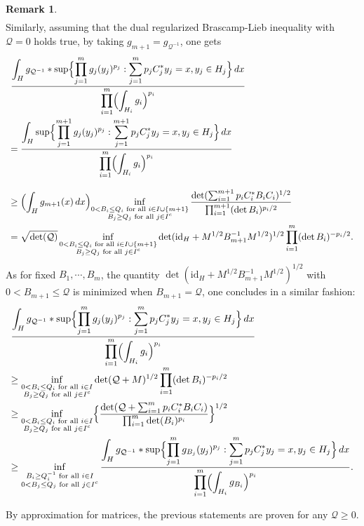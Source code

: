 \documentclass[11pt,a4paper,reqno]{amsart}
\numberwithin{equation}{section}
\theoremstyle{definition}
\newtheorem{remark}[theorem]{Remark}
\newcommand{\nm}{\noalign{\smallskip}}
\newcommand{\ds}{\displaystyle}
\newcommand{\<}{\ensuremath \leq}
\renewcommand{\>}{\ensuremath \geq}
\begin{document}
\begin{remark}
$$\begin{array}{lll}
\end{array}$$ 
Similarly, assuming that the dual regularized Brascamp-Lieb inequality with $\mathcal Q=0$ holds true, by taking $g_{m+1}=g_{\mathcal Q^{-1}}$, one gets $$\begin{array}{lll}
    \ds \frac{\ds \int_{H}g_{\mathcal Q^{-1}} * \sup \Bigl \{ \prod_{j=1}^m g_j(y_j)^{p_j}: \sum_{j=1}^m p_jC_j^*y_j=x, y_j \in H_j\Bigl \}\, dx}{\ds \prod_{i=1}^m \Bigl( \int_{H_i}g_i\Bigl)^{p_i}} \\
    \nm 
    \ds = \frac{\ds \int_{H}\sup \Bigl \{ \prod_{j=1}^{m+1} g_j(y_j)^{p_j}: \sum_{j=1}^{m+1} p_jC_j^*y_j=x, y_j \in H_j\Bigl \}\, dx}{\ds \prod_{i=1}^m \Bigl( \int_{H_i}g_i\Bigl)^{p_i}} \\ \\
    \geq \ds \Bigl( \int_H g_{m+1}(x)\, dx\Bigl) \inf_{\substack{0< B_i \leq Q_i \text{ for all } i \in I \cup \{m+1\} \\ B_j \geq Q_j \text{ for all } j \in I^c}}  \frac{\det(\sum_{i=1}^{m+1} p_i C_i^*B_iC_i)^{1/2}}{\prod_{i=1}^{m+1} (\det B_i)^{p_i/2}}  \\
    \nm 
    = \ds \sqrt{\det(\mathcal Q)} \inf_{\substack{0< B_i \leq Q_i \text{ for all } i \in I \cup \{m+1\} \\ B_j \geq Q_j \text{ for all } j \in I^c}}  \det(\mathrm{id}_H+M^{1/2}B_{m+1}^{-1}M^{1/2})^{1/2}\prod_{i=1}^m (\det B_i)^{-p_i/2}.
\end{array}$$ As for fixed $B_1,\cdots,B_m$, the quantity $\det(\mathrm{id}_H+M^{1/2}B_{m+1}^{-1}M^{1/2})^{1/2}$ with $0<B_{m+1} \leq \mathcal Q$ is minimized when $B_{m+1}=\mathcal Q$, one concludes in a similar fashion: $$\begin{array}{lll}
    \ds \frac{\ds \int_{H}g_{\mathcal Q^{-1}} * \sup \Bigl \{ \prod_{j=1}^m g_j(y_j)^{p_j}: \sum_{j=1}^m p_jC_j^*y_j=x, y_j \in H_j\Bigl \}\, dx}{\ds \prod_{i=1}^m \Bigl( \int_{H_i}g_i\Bigl)^{p_i}} \\
    \geq \ds \inf_{\substack{0< B_i \leq Q_i \text{ for all } i \in I \\ B_j \geq Q_j \text{ for all } j \in I^c}}  \det(\mathcal Q+M)^{1/2}\prod_{i=1}^m (\det B_i)^{-p_i/2} \\
    \nm 
    \geq \ds \inf_{\substack{0< B_i \leq Q_i \text{ for all } i \in I \\ B_j \geq Q_j \text{ for all } j \in I^c}} \Bigl\{\frac{\det(\mathcal Q+\sum_{i=1}^m p_iC_i^*B_iC_i)}{\prod_{i=1}^m \det(B_i)^{p_i}} \Bigl \}^{1/2} \\
    \nm \geq \ds \inf_{\substack{B_i \geq Q_i^{-1} \text{ for all } i \in I \\ 0<B_j \leq Q_j \text{ for all } j \in I^c}}\frac{\ds \int_H g_{\mathcal Q^{-1}} * \sup \Bigl \{ \prod_{j=1}^m g_{B_j}(y_j)^{p_j}: \sum_{j=1}^m p_jC_j^*y_j=x, y_j \in H_j\Bigl \}\, dx}{\ds \prod_{i=1}^m \Bigl( \int_{H_i}g_{B_i}\Bigl)^{p_i}}.
    \end{array}$$




By approximation for matrices, the previous statements are proven for any $\mathcal Q \geq 0.$ 
\end{remark}
\end{document}
